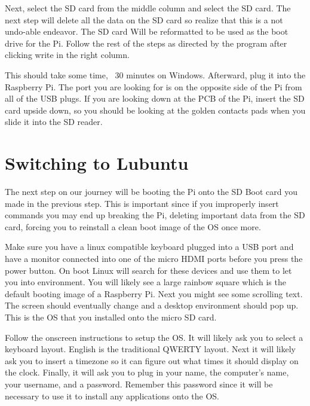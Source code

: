 \documentclass[letterpaper,12pt,notitlepage]{report} %
\begin{document}
Next, select the SD card from the middle column and select the SD card. The next step will delete all the data on the SD card so realize that this is a not undo-able endeavor. The SD card Will be reformatted to be used as the boot drive for the Pi. Follow the rest of the steps as directed by the program after clicking write in the right column. 

This should take some time, ~30 minutes on Windows. Afterward, plug it into the Raspberry Pi. The port you are looking for is on the opposite side of the Pi from all of the USB plugs. If you are looking down at the PCB of the Pi, insert the SD card upside down, so you should be looking at the golden contacts pads when you slide it into the SD reader. 

\section{Switching to Lubuntu}
The next step on our journey will be booting the Pi onto the SD Boot card you made in the previous step. This is important since if you improperly insert commands you may end up breaking the Pi, deleting important data from the SD card, forcing you to reinstall a clean boot image of the OS once more.

Make sure you have a linux compatible keyboard plugged into a USB port and have a monitor connected into one of the micro HDMI ports before you press the power button. On boot Linux will search for these devices and use them to let you into environment. You will likely see a large rainbow square which is the default booting image of a Raspberry Pi. Next you might see some scrolling text. The screen should eventually change and a desktop environment should pop up. This is the OS that you installed onto the micro SD card. 

Follow the onscreen instructions to setup the OS. It will likely ask you to select a keyboard layout. English is the traditional QWERTY layout. Next it will likely ask you to insert a timezone so it can figure out what times it should display on the clock. Finally, it will ask you to plug in your name, the computer's name, your username, and a password. Remember this password since it will be necessary to use it to install any applications onto the OS.
\end{document}
